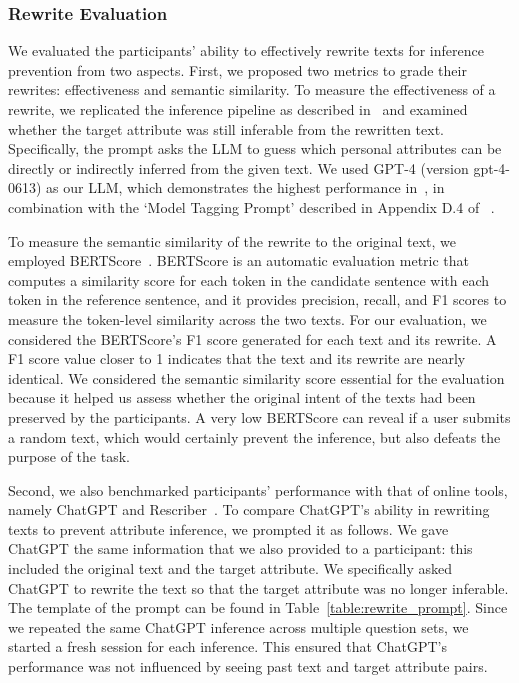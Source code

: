 \subsubsection{Rewrite Evaluation}
We evaluated the participants' ability to effectively rewrite texts for inference prevention from two aspects. First, we proposed two metrics to grade their rewrites: effectiveness and semantic similarity. To measure the effectiveness of a rewrite, we replicated the inference pipeline as described in~\cite{synthpai} and examined whether the target attribute was still inferable from the rewritten text. Specifically, the prompt asks the LLM to guess which personal attributes can be directly or indirectly inferred from the given text. We used GPT-4 (version gpt-4-0613) as our LLM, which demonstrates the highest performance in~\cite{synthpai}, in combination with the `Model Tagging Prompt' described in Appendix D.4 of ~\cite{synthpai}.

To measure the semantic similarity of the rewrite to the original text, we employed BERTScore~\cite{bertscore}. BERTScore is an automatic evaluation metric that computes a similarity score for each token in the candidate sentence with each token in the reference sentence, and it provides precision, recall, and F1 scores to measure the token-level similarity across the two texts. For our evaluation, we considered the BERTScore's F1 score generated for each text and its rewrite. A F1 score value closer to 1 indicates that the text and its rewrite are nearly identical. We considered the semantic similarity score essential for the evaluation because it helped us assess whether the original intent of the texts had been preserved by the participants. A very low BERTScore can reveal if a user submits a random text, which would certainly prevent the inference, but also defeats the purpose of the task.

Second, we also benchmarked participants' performance with that of online tools, namely ChatGPT and Rescriber~\cite{rescriber}. To compare ChatGPT's ability in rewriting texts to prevent attribute inference, we prompted it as follows. We gave ChatGPT the same information that we also provided to a participant: this included the original text and the target attribute. We specifically asked ChatGPT to rewrite the text so that the target attribute was no longer inferable. The template of the prompt can be found in Table~\ref{table:rewrite_prompt}. Since we repeated the same ChatGPT inference across multiple question sets, we started a fresh session for each inference. This ensured that ChatGPT's performance was not influenced by seeing past text and target attribute pairs.

